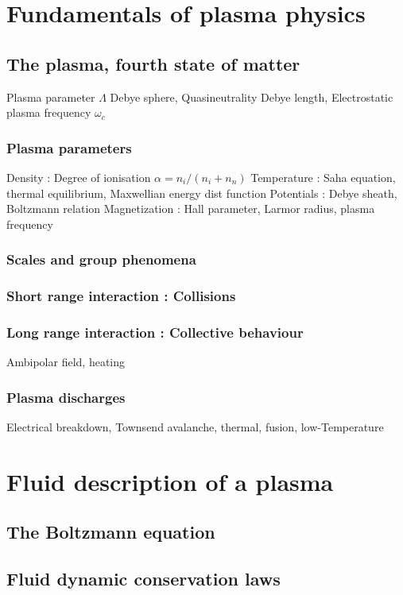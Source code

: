 	\section{Fundamentals of plasma physics}
		\subsection{The plasma, fourth state of matter}
		Plasma parameter $\Lambda$ Debye sphere, Quasineutrality Debye length, Electrostatic plasma frequency $\omega_c$
			\subsubsection{Plasma parameters}
			Density : Degree of ionisation $\alpha=n_i/(n_i+n_n)$
			Temperature : Saha equation, thermal equilibrium, Maxwellian energy dist function
			Potentials : Debye sheath, Boltzmann relation
			Magnetization : Hall parameter, Larmor radius, plasma frequency
			\subsubsection{Scales and group phenomena}
			\subsubsection{Short range interaction : Collisions}
			\subsubsection{Long range interaction : Collective behaviour}
			Ambipolar field, heating
			\subsubsection{Plasma discharges}
			Electrical breakdown, Townsend avalanche, thermal, fusion, low-Temperature
	\section{Fluid description of a plasma}
		\subsection{The Boltzmann equation}
		\subsection{Fluid dynamic conservation laws}
